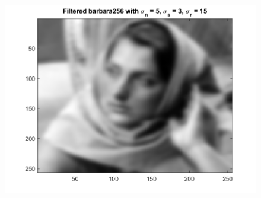 \documentclass{article}
\begin{document}
\begin{figure}[!htb]
\begin{minipage}[b]{0.3\textwidth}
        \includegraphics[width=\textwidth]{barbara256_5_3_15_9.png}
    \end{minipage}
\end{figure}
\end{document}
